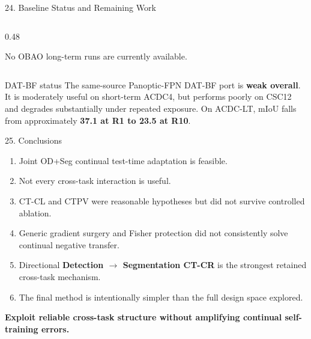 \documentclass[aspectratio=169,11pt]{beamer}
\begin{document}
\begin{frame}{24. Baseline Status and Remaining Work}
\begin{columns}[T,onlytextwidth]
\begin{column}{0.48\textwidth}
\vspace{0.1cm}

{\tiny
No OBAO long-term runs are currently available.
}

\end{column}

\end{columns}

\vspace{0.18cm}


\vspace{0.05cm}

\begin{block}{DAT-BF status}
\tiny
The same-source Panoptic-FPN DAT-BF port is
\textbf{weak overall}.
It is moderately useful on short-term ACDC4, but performs poorly on
CSC12 and degrades substantially under repeated exposure.
On ACDC-LT, mIoU falls from approximately
\textbf{37.1 at R1 to 23.5 at R10}.
\end{block}

\end{frame}
\begin{frame}{25. Conclusions}
\begin{enumerate}
  \item Joint OD+Seg continual test-time adaptation is feasible.
  \item Not every cross-task interaction is useful.
  \item CT-CL and CTPV were reasonable hypotheses but did not survive controlled ablation.
  \item Generic gradient surgery and Fisher protection did not consistently solve continual negative transfer.
  \item Directional \textbf{Detection $\rightarrow$ Segmentation CT-CR} is the strongest retained cross-task mechanism.
  \item The final method is intentionally simpler than the full design space explored.
\end{enumerate}

\vspace{0.5em}
\begin{center}
\Large\textbf{Exploit reliable cross-task structure without amplifying continual self-training errors.}
\end{center}
\end{frame}
\end{document}
